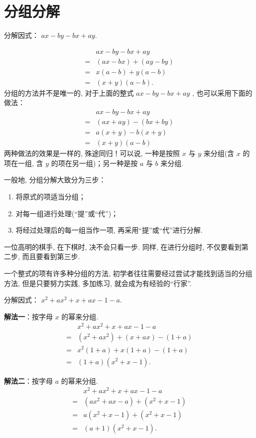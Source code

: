 \section{分组分解}
\begin{example}[分组分解三部曲]
	分解因式： $a x-b y-b x+a y .$
\end{example}
\begin{solution}
	\begin{align*}
		  & a x-b y-b x+a y     \\
		= & (a x-b x)+(a y-b y) \\
		= & x(a-b)+y(a-b)       \\
		= & (x+y)(a-b) .
	\end{align*}
	分组的方法并不是唯一的, 对于上面的整式 $a x-b y-b x+a y$ , 也可以采用下面的做法：
	\begin{align*}
		  & a x-b y-b x+a y     \\
		= & (a x+a y)-(b x+b y) \\
		= & a(x+y)-b(x+y)       \\
		= & (x+y)(a-b)
	\end{align*}
	两种做法的效果是一样的, 殊途同归！可以说, 一种是按照 $x$ 与 $y$ 来分组(含 $x$ 的项在一组, 含 $y$ 的项在另一组)；另一种是按 $a$ 与 $b$ 来分组.
\end{solution}
一般地, 分组分解大致分为三步：
\begin{enumerate}
	\item 将原式的项适当分组；
	\item 对每一组进行处理(“提”或“代”)；
	\item 将经过处理后的每一组当作一项, 再采用“提”或“代”进行分解.
\end{enumerate}
一位高明的棋手, 在下棋时, 决不会只看一步. 同样, 在进行分组时, 不仅要看到第二步, 而且要看到第三步.

一个整式的项有许多种分组的方法, 初学者往往需要经过尝试才能找到适当的分组方法, 但是只要努力实践, 多加练习, 就会成为有经验的“行家”.

\begin{example}[殊途同归]
	分解因式： $x^{2}+a x^{2}+x+a x-1-a$.
\end{example}
\begin{solution}
	\textbf{解法一}：按字母 $x$ 的幂来分组.
	\begin{align*}
		  & x^{2}+a x^{2}+x+a x-1-a                  \\
		= & \left(x^{2}+a x^{2}\right)+(x+a x)-(1+a) \\
		= & x^{2}(1+a)+x(1+a)-(1+a)                  \\
		= & (1+a)\left(x^{2}+x-1\right) .
	\end{align*}

	\textbf{解法二}：按字母 $a$ 的幂来分组.
	\begin{align*}
		  & x^{2}+a x^{2}+x+a x-1-a                           \\
		= & \left(a x^{2}+a x-a\right)+\left(x^{2}+x-1\right) \\
		= & a\left(x^{2}+x-1\right)+\left(x^{2}+x-1\right)    \\
		= & (a+1)\left(x^{2}+x-1\right) .
	\end{align*}
\end{solution}

